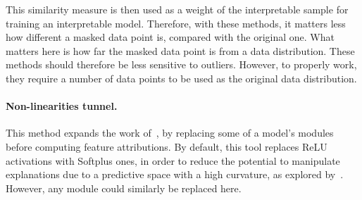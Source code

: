 This similarity measure is then used as a weight of the interpretable sample for training an interpretable model.
Therefore, with these methods, it matters less how different a masked data point is, compared with the original one.
What matters here is how far the masked data point is from a data distribution.
These methods should therefore be less sensitive to outliers.
However, to properly work, they require a number of data points to be used as the original data distribution.


\paragraph{Non-linearities tunnel.}

This method expands the work of~\citep{dombrowski2019explanations}, by replacing some of a model's modules before
computing feature attributions.
By default, this tool replaces ReLU activations with Softplus ones, in order to reduce the potential to manipulate
explanations due to a predictive space with a high curvature, as explored by~\citep{dombrowski2019explanations}.
However, any module could similarly be replaced here.
